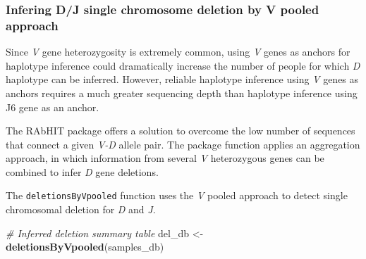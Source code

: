 \documentclass[11pt,]{article}
\newenvironment{Shaded}{}{}
\newcommand{\KeywordTok}[1]{\textcolor[rgb]{0.00,0.44,0.13}{\textbf{#1}}}
\newcommand{\StringTok}[1]{\textcolor[rgb]{0.25,0.44,0.63}{#1}}
\newcommand{\CommentTok}[1]{\textcolor[rgb]{0.38,0.63,0.69}{\textit{#1}}}
\newcommand{\NormalTok}[1]{#1}
\begin{document}
\subsubsection{Infering D/J single chromosome deletion by V pooled
approach}\label{infering-dj-single-chromosome-deletion-by-v-pooled-approach}

Since \emph{V} gene heterozygosity is extremely common, using \emph{V}
genes as anchors for haplotype inference could dramatically increase the
number of people for which \emph{D} haplotype can be inferred. However,
reliable haplotype inference using \emph{V} genes as anchors requires a
much greater sequencing depth than haplotype inference using J6 gene as
an anchor.

The RAbHIT package offers a solution to overcome the low number of
sequences that connect a given \emph{V-D} allele pair. The package
function applies an aggregation approach, in which information from
several \emph{V} heterozygous genes can be combined to infer \emph{D}
gene deletions.

The \texttt{deletionsByVpooled} function uses the \emph{V} pooled
approach to detect single chromosomal deletion for \emph{D} and
\emph{J}.

\begin{Shaded}
\begin{Highlighting}[]
\CommentTok{# Inferred deletion summary table}
\NormalTok{del_db <-}\StringTok{ }\KeywordTok{deletionsByVpooled}\NormalTok{(samples_db)}
\end{Highlighting}
\end{Shaded}
\end{document}
